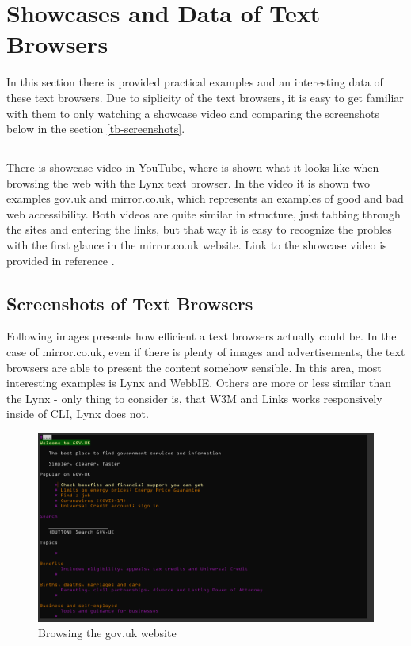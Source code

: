 \section[tb-general]{Showcases and Data of Text Browsers}
In this section there is provided practical examples and an interesting data  of these text browsers. Due to siplicity of the text browsers, it is easy to get familiar with them to only watching a showcase video and comparing the screenshots below in the section \ref*{tb-screenshots}.
\subsection[tb-showcase]{}
There is showcase video in YouTube, where is shown what it looks like when browsing the web with the Lynx text browser. In the video it is shown two examples gov.uk and mirror.co.uk, which represents an examples of good and bad web accessibility. Both videos are quite similar in structure, just tabbing through the sites and entering the links, but that way it is easy to recognize the probles with the first glance in the mirror.co.uk website. Link to the showcase video is provided in reference \textcite{tb-showcase}.
\subsection[tb-screenshots]{Screenshots of Text Browsers}
Following images presents how efficient a text browsers actually could be. In the case of mirror.co.uk, even if there is plenty of images and advertisements, the text browsers are able to present the content somehow sensible. In this area, most interesting examples is Lynx and WebbIE. Others are more or less similar than the Lynx - only thing to consider is, that W3M and Links works responsively inside of CLI, Lynx does not. 

\begin{figure}[tp]
    \centering
    \includegraphics[keepaspectratio,width=\linewidth,height=\halfh]
    {images/lynx-gov}
    
    \caption[Lynx browser]
    {%
    Browsing the gov.uk website
    }
    \label{fig:lynx-gov}
\end{figure}

